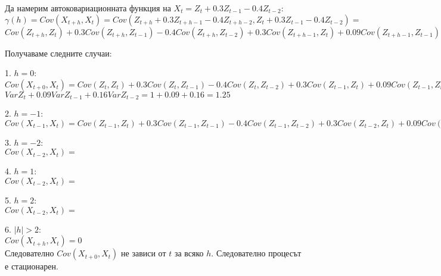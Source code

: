 \documentclass{article}
\begin{document}
\begin{flushleft}
\begin{flushleft}
\begin{flushleft}
Да намерим автоковариационната функция на $X_t = Z_t + 0.3Z_{t-1} - 0.4Z_{t-2}:$ \\
$\gamma(h) = Cov(X_{t+h}, X_t) = Cov(Z_{t+h} + 0.3Z_{t+h-1} - 0.4Z_{t+h-2}, Z_t + 0.3Z_{t-1} - 0.4Z_{t-2}) =$ \\
$Cov(Z_{t+h}, Z_t) + 0.3Cov(Z_{t+h}, Z_{t-1}) - 0.4Cov(Z_{t+h}, Z_{t-2}) + 0.3Cov(Z_{t+h-1}, Z_t) + 0.09Cov(Z_{t+h-1}, Z_{t-1}) - 0.12Cov(Z_{t+h-1}, Z_{t-2}) - 0.4Cov(Z_{t+h-2}, Z_t) - 0.12Cov(Z_{t+h-2}, Z_{t-1}) + 0.16Cov(Z_{t+h-2}, Z_{t-2})$
\end{flushleft}

Получаваме следните случаи: \\
\begin{flushleft}
1. $h = 0$: \\
$Cov(X_{t+0}, X_t) = Cov(Z_{t}, Z_t) + 0.3Cov(Z_{t}, Z_{t-1}) - 0.4Cov(Z_{t}, Z_{t-2}) + 0.3Cov(Z_{t-1}, Z_t) + 0.09Cov(Z_{t-1}, Z_{t-1}) - 0.12Cov(Z_{t-1}, Z_{t-2}) - 0.4Cov(Z_{t-2}, Z_t) - 0.12Cov(Z_{t-2}, Z_{t-1}) + 0.16Cov(Z_{t-2}, Z_{t-2}) = $ \\
$VarZ_t + 0.09VarZ_{t-1} + 0.16VarZ_{t-2} = 1 + 0.09 + 0.16 = 1.25$
\end{flushleft}

\begin{flushleft}
2. $h = -1$: \\
$Cov(X_{t-1}, X_t) = Cov(Z_{t-1}, Z_t) + 0.3Cov(Z_{t-1}, Z_{t-1}) - 0.4Cov(Z_{t-1}, Z_{t-2}) + 0.3Cov(Z_{t-2}, Z_t) + 0.09Cov(Z_{t-2}, Z_{t-1}) - 0.12Cov(Z_{t-2}, Z_{t-2}) - 0.4Cov(Z_{t-3}, Z_t) - 0.12Cov(Z_{t-3}, Z_{t-1}) + 0.16Cov(Z_{t-3}, Z_{t-2})$
\end{flushleft}

\begin{flushleft}
3. $h = -2$: \\
$Cov(X_{t-2}, X_t) = $
\end{flushleft}

\begin{flushleft}
4. $h = 1$: \\
$Cov(X_{t-2}, X_t) = $
\end{flushleft}

\begin{flushleft}
5. $h = 2$: \\
$Cov(X_{t-2}, X_t) = $
\end{flushleft}

\begin{flushleft}
6. $|h| > 2$: \\
$Cov(X_{t+h}, X_t) = 0$ \\
Следователно $Cov(X_{t+0}, X_t)$ не зависи от $t$ за всяко $h$. Следователно процесът е стационарен.
\end{flushleft}
\end{flushleft}


\end{flushleft}
\end{document}
